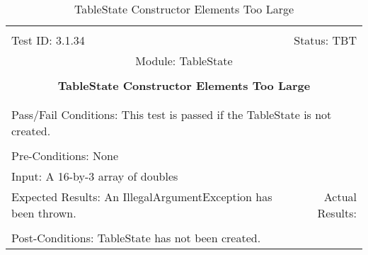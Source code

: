 \documentclass[titlepage]{article}
\begin{document}
\begin{center}%
\begin{table}
\begin{tabular}{|l r|}\hline&\\[-2mm]
	Test ID: 3.1.34	&Status: TBT\\[-3mm]
	\multicolumn{2}{|c|}{Module: TableState}\\&\\
	\multicolumn{2}{|c|}{\textbf{\large{TableState Constructor Elements Too Large}}}\\&\\\hline&\\[-3mm]
	\multicolumn{2}{|p{\textwidth}|}{Pass/Fail Conditions: This test is passed if the TableState is not created.}\\[1mm]\hline&\\[-3mm]
	\multicolumn{2}{|p{\textwidth}|}{Pre-Conditions: None}\\[4mm]
	\multicolumn{2}{|p{\textwidth}|}{Input: A 16-by-3 array of doubles}\\[2mm]\hline
	\multicolumn{1}{|p{0.49\textwidth}}{Expected Results: An IllegalArgumentException has been thrown.}	&\multicolumn{1}{|p{0.45\textwidth}|}{Actual Results: }\\\hline&\\[-3mm]
	\multicolumn{2}{|p{\textwidth}|}{Post-Conditions: TableState has not been created.}\\\hline
\end{tabular}
\caption{TableState Constructor Elements Too Large}
\end{table}
\end{center}
\end{document}
